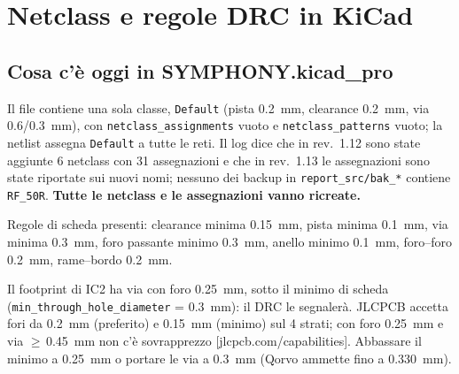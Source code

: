 \documentclass[a4paper,10pt]{article}
\newcommand{\fonte}[1]{{\footnotesize\color{sbgray}[#1]}}
\begin{document}
\section{Netclass e regole DRC in KiCad}
\label{sec:netclass}

\subsection{Cosa c'è oggi in SYMPHONY.kicad\_pro}
\begin{attenzione}
Il file contiene una sola classe, \texttt{Default} (pista \SI{0.2}{mm}, clearance \SI{0.2}{mm}, via
\SI{0.6}{}/\SI{0.3}{mm}), con \texttt{netclass\_assignments} vuoto e \texttt{netclass\_patterns} vuoto; la
netlist assegna \texttt{Default} a tutte le reti. Il log dice che in rev.~1.12 sono state aggiunte 6 netclass
con 31 assegnazioni e che in rev.~1.13 le assegnazioni sono state riportate sui nuovi nomi; nessuno dei
backup in \texttt{report\_src/bak\_*} contiene \texttt{RF\_50R}. \textbf{Tutte le netclass e le assegnazioni
vanno ricreate.}
\end{attenzione}

Regole di scheda presenti: clearance minima \SI{0.15}{mm}, pista minima \SI{0.1}{mm}, via minima
\SI{0.3}{mm}, foro passante minimo \SI{0.3}{mm}, anello minimo \SI{0.1}{mm}, foro--foro \SI{0.2}{mm},
rame--bordo \SI{0.2}{mm}.

\begin{attenzione}
Il footprint di IC2 ha via con foro \SI{0.25}{mm}, sotto il minimo di scheda (\texttt{min\_through\_hole\_diameter}
= \SI{0.3}{mm}): il DRC le segnalerà. JLCPCB accetta fori da \SI{0.2}{mm} (preferito) e \SI{0.15}{mm}
(minimo) sul 4 strati; con foro \SI{0.25}{mm} e via $\ge$\,\SI{0.45}{mm} non c'è sovrapprezzo
\fonte{jlcpcb.com/capabilities}. Abbassare il minimo a \SI{0.25}{mm} o portare le via a \SI{0.3}{mm}
(Qorvo ammette fino a \SI{0.330}{mm}).
\end{attenzione}
\end{document}
